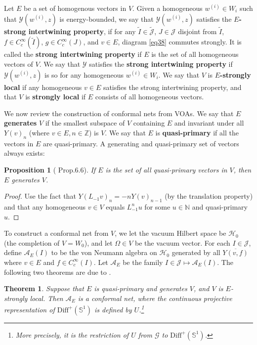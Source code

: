 \documentclass[12pt,a4paper]{article}
\theoremstyle{definition}
\theoremstyle{plain}
\newtheorem{thm}[df]{Theorem}
\newtheorem{pp}[df]{Proposition}
\newcommand{\mc}{\mathcal}
\newcommand{\wtd}{\widetilde}
\newcommand{\ovl}{\overline}
\newcommand{\Diffp}{\mathrm{Diff}^+}
\newcommand{\scr}{\mathscr}
\newcommand{\Jtd}{\widetilde{\mathcal J}}
\newcommand{\mbb}{\mathbb}
\numberwithin{equation}{subsection}
\begin{document}
Let $E$ be a set of homogenous vectors in $V$. Given a homogeneous $w^{(i)}\in W_i$ such that $\mc Y(w^{(i)},z)$ is energy-bounded, we say that $\mc Y(w^{(i)},z)$ satisfies the \textbf{$E$-strong intertwining property}, if for any $\wtd I\in\Jtd$, $J\in\mc J$ disjoint from $\wtd I$, $f\in C_c^\infty(\wtd I)$, $g\in C_c^\infty(J)$, and  $v\in E$, diagram \ref{eq38} commutes strongly. It is called the  \textbf{strong intertwining property} if $E$ is the set of all homogeneous vectors of $V$. We say that $\mc Y$ satisfies the \textbf{strong intertwining property} if $\mc Y(w^{(i)},z)$ is so for any homogeneous $w^{(i)}\in W_i$. We say that $V$ is \textbf{$E$-strongly local} \cite{CKLW18} if any homogeneous $v\in E$ satisfies the strong intertwining property, and that $V$ is \textbf{strongly local} if $E$ consists of all homogeneous vectors.

We now review the construction of conformal nets from VOAs. We say that $E$ \textbf{generates} $V$ if the smallest subspace of $V$ containing $E$ and invariant under all $Y(v)_n$ (where $v\in E,n\in\mbb Z$) is $V$. We say that $E$ is \textbf{quasi-primary} if all the vectors in $E$ are quasi-primary. A generating and quasi-primary set of vectors always exists:

\begin{pp}[\cite{CKLW18} Prop.6.6]\label{lb56}
If $E$ is the set of all quasi-primary vectors in $V$, then $E$ generates $V$.
\end{pp}
\begin{proof}
Use the fact that $Y(L_{-1}v)_n=-nY(v)_{n-1}$ (by the translation property) and that any homogeneous $v\in V$ equals $L_{-1}^nu$ for some $u\in\mbb N$ and quasi-primary $u$.
\end{proof}



To construct a conformal net from $V$, we   let the vacuum Hilbert space be $\mc H_0$ (the completion of $V=W_0$), and let $\Omega\in V$ be the vacuum vector. For each $I\in\mc J$, define $\mc A_E(I)$ to be the von Neumann algebra on $\mc H_0$ generated by all $\ovl{Y(v,f)}$ where $v\in E$ and $f\in C_c^\infty(I)$. Let $\mc A_E$ be the family $I\in\mc J\mapsto \mc A_E(I)$. The following two theorems are due to \cite{CKLW18}.

\begin{thm}
Suppose that $E$ is quasi-primary and generates $V$, and $V$ is $E$-strongly local. Then $\mc A_E$ is a conformal net, where the continuous projective representation of $\Diffp(\mbb S^1)$ is defined by $U$.\footnote{More precisely, it is the restriction of $U$ from $\scr G$ to $\Diffp(\mbb S^1)$.}
\end{thm}
\end{document}
